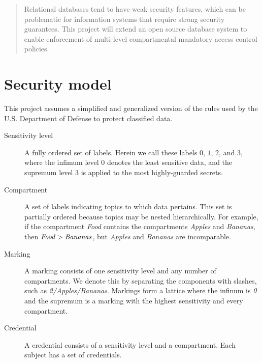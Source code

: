 \documentclass{article}
\begin{document}
\maketitle

\begin{abstract}
Relational databases tend to have weak security features, which can be problematic for information systems that require strong security guarantees. This project will extend an open source database system to enable enforcement of multi-level compartmental mandatory access control policies.

\end{abstract}

\section{Security model}

This project assumes a simplified and generalized version of the rules used by the U.S. Department of Defense to protect classified data.

\begin{description}

  \item[Sensitivity level] A fully ordered set of labels. Herein we call these labels $0$, $1$, $2$, and $3$, where the infimum level $0$ denotes the least sensitive data, and the supremum level $3$ is applied to the most highly-guarded secrets.

  \item[Compartment] A set of labels indicating topics to which data pertains. This set is partially ordered because topics may be nested hierarchically. For example, if the compartment {\it Food} contains the compartments {\it Apples} and {\it Bananas}, then ${\it Food} > {\it Bananas}$, but {\it Apples} and {\it Bananas} are incomparable.

  \item[Marking] A marking consists of one sensitivity level and any number of compartments. We denote this by separating the components with slashes, such as {\it 2/Apples/Bananas}. Markings form a lattice where the infinum is {\it 0} and the supremum is a marking with the highest sensitivity and every compartment.

  \item[Credential] A credential consists of a sensitivity level and a compartment. Each subject has a set of credentials.

\end{description}
\end{document}
